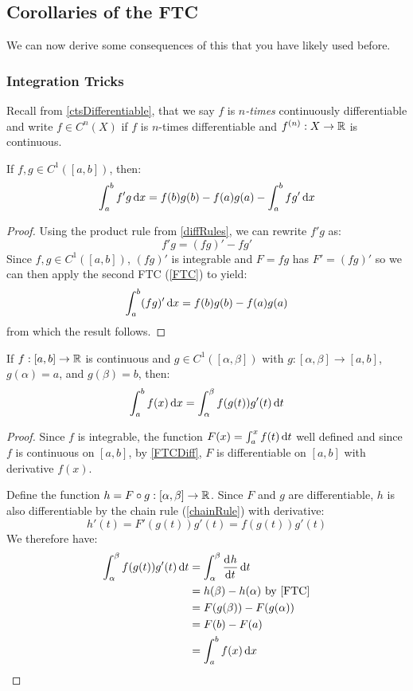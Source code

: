 \documentclass[../main.tex]{subfiles}
\begin{document}
\subsection{Corollaries of the FTC}
We can now derive some consequences of this that you have likely used before.
\subsubsection{Integration Tricks}
\begin{remark}
  Recall from \cref{ctsDifferentiable}, that we say $f$ is \textit{$n$-times} continuously differentiable and write $f \in C^{n}(X)$ if $f$ is $n$-times differentiable and $f^{(n)}: X \to \mathbb{R}$ is continuous.
\end{remark}
\begin{proposition}
  If $f, g \in C^{1}([a, b])$, then: \label{IBP}
  \[
    \int_{a}^{b} f'g \d{x} = f(b)g(b) - f(a)g(a) - \int_{a}^{b} fg' \d{x}
  \]
\end{proposition}
\begin{proof}
  Using the product rule from \cref{diffRules}, we can rewrite $f'g$ as:
  \[
    f'g = (fg)'-fg'
  \]
  Since $f, g \in C^{1}([a, b])$, $(fg)'$ is integrable and $F = fg$ has $F' = (fg)'$ so we can then apply the second FTC (\cref{FTC}) to yield:
  \[
    \int_{a}^{b} (fg)' \d{x} = f(b)g(b) - f(a)g(a)
  \]
  from which the result follows.
\end{proof}
\begin{proposition}
  If $f: [a, b] \to \mathbb{R}$ is continuous and $g \in C^{1}([\alpha, \beta])$ with $g: [\alpha, \beta] \to [a, b]$, $g(\alpha) = a$, and $g(\beta) = b$, then: \label{integrationSubstitution}
  \[
    \int_{a}^{b} f(x) \d{x} = \int_{\alpha}^{\beta} f(g(t))g'(t) \d{t}
  \]
\end{proposition}
\begin{proof}
  Since $f$ is integrable, the function $F(x) = \int_{a}^{x} f(t) \d{t}$ well defined and since $f$ is continuous on $[a, b]$, by \cref{FTCDiff}, $F$ is differentiable on $[a, b]$ with derivative $f(x)$.

  Define the function $h = F \circ g: [\alpha , \beta] \to \mathbb{R}$.
  Since $F$ and $g$ are differentiable, $h$ is also differentiable by the chain rule (\cref{chainRule}) with derivative:
  \[
    h'(t) = F'(g(t)) g'(t) = f(g(t))g'(t)
  \]
  We therefore have:
  \begin{align*}
    \int_{\alpha}^{\beta} f(g(t))g'(t) \d{t} &= \int_{\alpha}^{\beta} \deriv{h}{t} \d{t} \\
                                             &= h(\beta) - h(\alpha) \text{ by \cref{FTC}} \\\
                                             &= F(g(\beta)) - F(g(\alpha)) \\
                                             &= F(b) - F(a) \\
                                             &= \int_{a}^{b} f(x) \d{x}
  \end{align*}
\end{proof}
\end{document}

